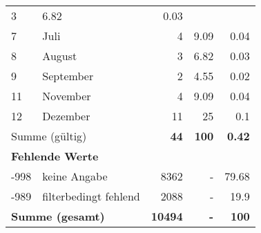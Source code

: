 \begin{longtable}{lXrrr}
       \num{3} &
       \num[round-mode=places,round-precision=2]{6.82} &
         \num[round-mode=places,round-precision=2]{0.03} \\

     7 &
     \multicolumn{1}{X}{ Juli   } &


       \num{4} &
       \num[round-mode=places,round-precision=2]{9.09} &
         \num[round-mode=places,round-precision=2]{0.04} \\

     8 &
     \multicolumn{1}{X}{ August   } &


       \num{3} &
       \num[round-mode=places,round-precision=2]{6.82} &
         \num[round-mode=places,round-precision=2]{0.03} \\

     9 &
     \multicolumn{1}{X}{ September   } &


       \num{2} &
       \num[round-mode=places,round-precision=2]{4.55} &
         \num[round-mode=places,round-precision=2]{0.02} \\

     11 &
     \multicolumn{1}{X}{ November   } &


       \num{4} &
       \num[round-mode=places,round-precision=2]{9.09} &
         \num[round-mode=places,round-precision=2]{0.04} \\

     12 &
     \multicolumn{1}{X}{ Dezember   } &


       \num{11} &
       \num[round-mode=places,round-precision=2]{25} &
         \num[round-mode=places,round-precision=2]{0.1} \\
     \midrule
     \multicolumn{2}{l}{Summe (gültig)} &
       \textbf{\num{44}} &
     \textbf{\num{100}} &
       \textbf{\num[round-mode=places,round-precision=2]{0.42}} \\
     \multicolumn{5}{l}{\textbf{Fehlende Werte}}\\
       -998 &
       keine Angabe &
         \num{8362} &
        - &
         \num[round-mode=places,round-precision=2]{79.68} \\
       -989 &
       filterbedingt fehlend &
         \num{2088} &
        - &
         \num[round-mode=places,round-precision=2]{19.9} \\
     \midrule
     \multicolumn{2}{l}{\textbf{Summe (gesamt)}} &
          \textbf{\num{10494}} &
        \textbf{-} &
        \textbf{\num{100}} \\
     \bottomrule
     \end{longtable}
     
